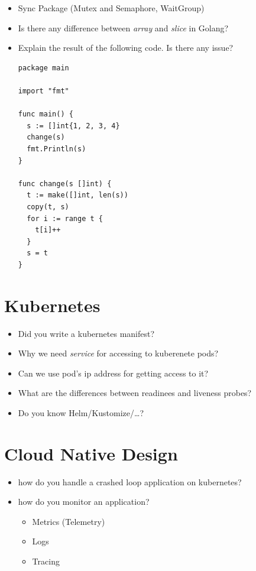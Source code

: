 \documentclass[]{book}
\begin{document}
\begin{itemize}
  \item Sync Package (Mutex and Semaphore, WaitGroup)
  \item Is there any difference between \textit{\color{YellowOrange} array} and \textit{\color{YellowOrange} slice} in Golang?
  \item Explain the result of the following code. Is there any issue?
    \begin{verbatim}
package main

import "fmt"

func main() {
  s := []int{1, 2, 3, 4}
  change(s)
  fmt.Println(s)
}

func change(s []int) {
  t := make([]int, len(s))
  copy(t, s)
  for i := range t {
    t[i]++
  }
  s = t
}
    \end{verbatim}

\end{itemize}

\section{Kubernetes}

\begin{itemize}
  \item Did you write a kubernetes manifest?
  \item Why we need \textit{service} for accessing to kuberenete pods?
  \item Can we use pod's ip address for getting access to it?
  \item What are the differences between readinees and liveness probes?
  \item Do you know Helm/Kustomize/\ldots?
\end{itemize}

\section{Cloud Native Design}

\begin{itemize}
  \item how do you handle a crashed loop application on kubernetes?
  \item how do you monitor an application?
    \begin{itemize}
      \item Metrics (Telemetry)
      \item Logs
      \item Tracing
    \end{itemize}
\end{itemize}
\end{document}
